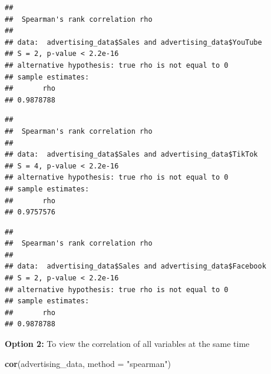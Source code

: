 \documentclass[
]{article}
\newenvironment{Shaded}{\begin{snugshade}}{\end{snugshade}}
\newcommand{\AttributeTok}[1]{\textcolor[rgb]{0.13,0.29,0.53}{#1}}
\newcommand{\FunctionTok}[1]{\textcolor[rgb]{0.13,0.29,0.53}{\textbf{#1}}}
\newcommand{\NormalTok}[1]{#1}
\newcommand{\SpecialCharTok}[1]{\textcolor[rgb]{0.81,0.36,0.00}{\textbf{#1}}}
\newcommand{\StringTok}[1]{\textcolor[rgb]{0.31,0.60,0.02}{#1}}
\begin{document}
\begin{verbatim}
## 
##  Spearman's rank correlation rho
## 
## data:  advertising_data$Sales and advertising_data$YouTube
## S = 2, p-value < 2.2e-16
## alternative hypothesis: true rho is not equal to 0
## sample estimates:
##       rho 
## 0.9878788
\end{verbatim}

\begin{Shaded}
\end{Shaded}

\begin{verbatim}
## 
##  Spearman's rank correlation rho
## 
## data:  advertising_data$Sales and advertising_data$TikTok
## S = 4, p-value < 2.2e-16
## alternative hypothesis: true rho is not equal to 0
## sample estimates:
##       rho 
## 0.9757576
\end{verbatim}

\begin{Shaded}
\end{Shaded}

\begin{verbatim}
## 
##  Spearman's rank correlation rho
## 
## data:  advertising_data$Sales and advertising_data$Facebook
## S = 2, p-value < 2.2e-16
## alternative hypothesis: true rho is not equal to 0
## sample estimates:
##       rho 
## 0.9878788
\end{verbatim}

\textbf{Option 2:} To view the correlation of all variables at the same
time

\begin{Shaded}
\begin{Highlighting}[]
\FunctionTok{cor}\NormalTok{(advertising\_data, }\AttributeTok{method =} \StringTok{"spearman"}\NormalTok{)}
\end{Highlighting}
\end{Shaded}
\end{document}
